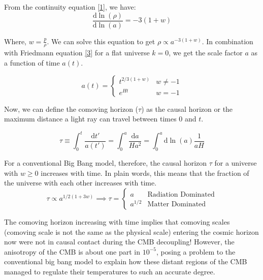 \documentclass[aps,prd,reprint,preprintnumbers,showpacs,floatfix,nofootinbib,superscript address]{revtex4-2}
\begin{document}
From the continuity equation \ref{1}, we have:
\begin{equation} \label{4}
    \frac{\mathrm{d}  \ln(\rho)}{\mathrm{d} \ln(a)} = -3(1+w)
\end{equation}

Where, $w = \frac{p}{\rho}$. We can solve this equation to get $\rho \propto a^{-3(1+w)}$. In combination with Friedmann equation \ref{3} for a flat universe $k = 0$, we get the scale factor $a$ as a function of time $a(t)$.

\begin{equation}    \label{5}
    a(t) = \begin{cases}
        t^{2/3(1+w)} & w \neq -1 \\
        e^{Ht} & w = -1
    \end{cases}
\end{equation}

Now, we can define the comoving horizon ($\tau$) as the causal horizon or the maximum distance a light ray can travel between times 0 and $t$.

\begin{equation}    \label{6}
    \tau \equiv \int_{0}^{t} \frac{\mathrm{d} t'}{a(t')} = \int_{0}^{a} \frac{\mathrm{d}a}{H a^2} = \int_{0}^{a} \mathrm{d} \ln(a) \frac{1}{aH}
\end{equation}

For a conventional Big Bang model, therefore, the causal horizon $\tau$ for a universe with $w \geq 0$ increases with time. In plain words, this means that the fraction of the universe with each other increases with time.
\begin{equation}
    \tau \propto a^{1/2(1+3w)} \implies \tau = \begin{cases}
        a & \text{Radiation Dominated} \\
        a^{1/2} & \text{Matter Dominated}
    \end{cases}
\end{equation}

The comoving horizon increasing with time implies that comoving scales (comoving scale is not the same as the physical scale) entering the cosmic horizon now were not in causal contact during the CMB decoupling! However, the anisotropy of the CMB is about one part in $10^{-5}$, posing a problem to the conventional big bang model to explain how these distant regions of the CMB managed to regulate their temperatures to such an accurate degree.
\end{document}
